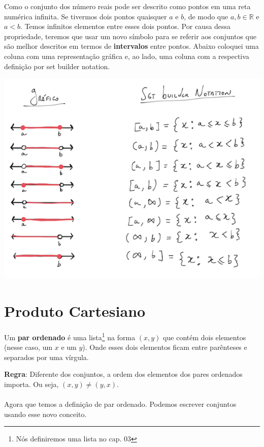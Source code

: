 \documentclass[main.tex]{subfiles}
\begin{document}
Como o conjunto dos número reais pode ser descrito como pontos em uma reta numérica infinita. Se tivermos dois pontos quaisquer $a$ e $b$, de modo que $a , b \in \mathbb{R}$ e $a < b$. Temos infinitos elementos entre esses dois pontos. Por causa dessa propriedade, teremos que usar um novo símbolo para se referir aos conjuntos que são melhor descritos em termos de \textbf{intervalos} entre pontos. Abaixo coloquei uma coluna com uma representação gráfica e, ao lado, uma coluna com a respectiva definição por set builder notation.
\begin{center}
	\includegraphics[scale=0.7]{images/intervals.png}
\end{center}

\section{Produto Cartesiano}
\begin{definition}
Um \textbf{par ordenado} é uma lista\footnote{Nós definiremos uma lista no cap. 03} na forma $(x, y)$ que contém dois elementos (nesse caso, um $x$ e um $y$). Onde esses dois elementos ficam entre parênteses e separados por uma vírgula.
\end{definition}

\textbf{Regra}: Diferente dos conjuntos, a ordem dos elementos dos pares ordenados importa. Ou seja, $(x,y) \neq (y,x)$. 
\\~\\
Agora que temos a definição de par ordenado. Podemos escrever conjuntos usando esse novo conceito.
\end{document}
